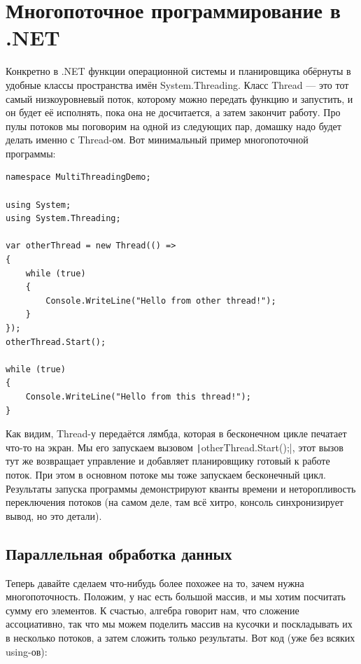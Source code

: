 \documentclass{../../text-style}
\begin{document}
\section{Многопоточное программирование в .NET}

Конкретно в .NET функции операционной системы и планировщика обёрнуты в удобные классы пространства имён System.Threading. Класс Thread --- это тот самый низкоуровневый поток, которому можно передать функцию и запустить, и он будет её исполнять, пока она не досчитается, а затем закончит работу. Про пулы потоков мы поговорим на одной из следующих пар, домашку надо будет делать именно с Thread-ом. Вот минимальный пример многопоточной программы:

\begin{verbatim}
namespace MultiThreadingDemo;

using System;
using System.Threading;

var otherThread = new Thread(() => 
{
    while (true)
    {
        Console.WriteLine("Hello from other thread!");
    }
});
otherThread.Start();

while (true)
{
    Console.WriteLine("Hello from this thread!");
}
\end{verbatim}

Как видим, Thread-у передаётся лямбда, которая в бесконечном цикле печатает что-то на экран. Мы его запускаем вызовом \texttt|otherThread.Start();|, этот вызов тут же возвращает управление и добавляет планировщику готовый к работе поток. При этом в основном потоке мы тоже запускаем бесконечный цикл. Результаты запуска программы демонстрируют кванты времени и неторопливость переключения потоков (на самом деле, там всё хитро, консоль синхронизирует вывод, но это детали).

\subsection{Параллельная обработка данных}

Теперь давайте сделаем что-нибудь более похожее на то, зачем нужна многопоточность. Положим, у нас есть большой массив, и мы хотим посчитать сумму его элементов. К счастью, алгебра говорит нам, что сложение ассоциативно, так что мы можем поделить массив на кусочки и поскладывать их в несколько потоков, а затем сложить только результаты. Вот код (уже без всяких using-ов):
\end{document}
